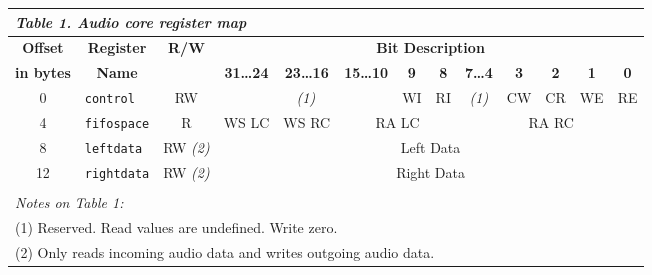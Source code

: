 \documentclass[11pt, twoside, pdftex]{article}
\begin{document}
\begin{table}[h]
    \centering
    \begin{tabular}{|c|l|c|c|c|c|c|c|c|c|c|c|c|}
        \hline
        \multicolumn{13}{|l|}{\it \textbf{{Table 1. Audio core register map}}}
        \\\hline
            \textbf{Offset}
            & \multicolumn{1}{c|}{\textbf{Register}}
            & \multirow{2}{*}{\textbf{R/W}}
            & \multicolumn{10}{c|}{\textbf{Bit Description}}
        \\\cline{4-13}
            \textbf{in bytes}
            & \multicolumn{1}{c|}{\textbf{Name}}
            &
            & \textbf{31\ldots24}
            & \textbf{23\ldots16}
            & \textbf{15\ldots10}
            & \textbf{9}
            & \textbf{8}
            & \textbf{7\ldots4}
            & \textbf{3}
            & \textbf{2}
            & \textbf{1}
            & \textbf{0}
        \\\hline
            0
            & \texttt{control}
            & RW
            & \multicolumn{3}{c|}{\footnotesize \it (1)}
            & WI
            & RI
            & {\footnotesize \it (1)}
            & CW
            & CR
            & WE
            & RE
        \\\hline
            4
            & \texttt{fifospace}
            & R
            & WS LC
            & WS RC
            & \multicolumn{3}{c|}{RA LC}
            & \multicolumn{5}{c|}{RA RC}
        \\\hline
            8
            & \texttt{leftdata}
            & RW {\footnotesize \it (2)}
            & \multicolumn{10}{c|}{Left Data}
        \\\hline
            12
            & \texttt{rightdata}
            & RW {\footnotesize \it (2)}
            & \multicolumn{10}{c|}{Right Data}
        \\\hline
                \multicolumn{13}{l}{}
        \\
                \multicolumn{13}{l}{\footnotesize \it{Notes on Table 1: }}
        \\
                \multicolumn{13}{l}{\footnotesize{(1) Reserved. Read values are undefined. Write zero.}}
        \\
                \multicolumn{13}{l}{\footnotesize{(2) Only reads incoming audio data and writes outgoing audio data.}}
    \end{tabular}
    \label{tab:regfiles}
\end{table}
\end{document}
